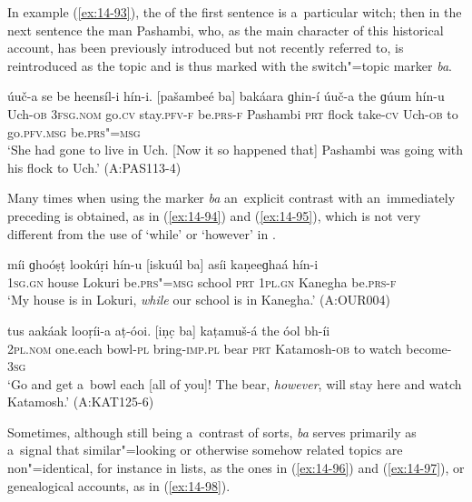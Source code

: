 In example (\ref{ex:14-93}), the  of the first sentence is a~particular witch; then in the next sentence the man Pashambi, who, as the main character of this historical account, has been previously introduced but not recently referred to, is reintroduced as the topic   and is thus marked with the switch"=topic marker \textit{ba}.

\begin{exe}
\ex
\label{ex:14-93}
\gll úuč-a se  be heensíl-i  hín-i. [pašambeé ba] bakáara ɡhin-í úuč-a the ɡúum hín-u \\
Uch-\textsc{ob} \textsc{3fsg.nom} go.\textsc{cv} stay.\textsc{pfv-f} be.\textsc{prs-f} Pashambi  \textsc{prt} flock take-\textsc{cv} Uch-\textsc{ob} to go.\textsc{pfv.msg} be.\textsc{prs"=msg} \\
\glt `She had gone to live in Uch. [Now it so happened that] Pashambi was going with his flock to Uch.' (A:PAS113-4)
\end{exe}

Many times when using the marker \textit{ba} an~explicit contrast with an~immediately preceding  is obtained, as in (\ref{ex:14-94}) and (\ref{ex:14-95}), which is not very different from the use of `while' or `however' in .

\begin{exe}
\ex
\label{ex:14-94}
\gll míi ɡhoóṣṭ lookúṛi hín-u [iskuúl ba] asíi  kaṇeeɡhaá hín-i \\
\textsc{1sg.gn} house Lokuri be.\textsc{prs"=msg} school \textsc{prt} \textsc{1pl.gn} Kanegha be.\textsc{prs-f } \\
\glt `My house is in Lokuri, \textit{while} our school is in Kanegha.' (A:OUR004)

\ex
\label{ex:14-95}
\gll tus aakáak looṛíi-a aṭ-óoi. [iṇc̣ ba]  kaṭamuš-á the óol bh-íi \\
\textsc{2pl.nom} one.each bowl-\textsc{pl} bring-\textsc{imp.pl} bear \textsc{prt}  Katamosh-\textsc{ob} to watch become-\textsc{3sg } \\
\glt `Go and get a~bowl each [all of you]! The bear, \textit{however}, will stay here and watch Katamosh.' (A:KAT125-6)
\end{exe}

Sometimes, although still being a~contrast of sorts, \textit{ba} serves primarily as a~signal that similar"=looking or otherwise somehow related topics are non"=identical, for instance in lists, as the ones in (\ref{ex:14-96}) and (\ref{ex:14-97}), or genealogical accounts, as in (\ref{ex:14-98}). 

